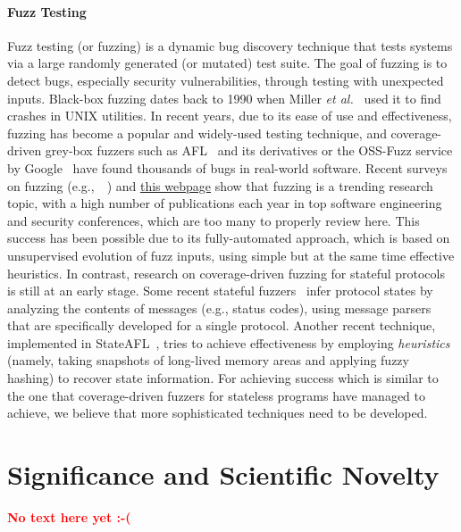 \documentclass[11pt]{article}
\newcommand{\FIX}[1]{\textcolor{red}{\textbf{#1}}}
\newcommand{\system}[1]{\mbox{\textsf{#1}}}
\newcommand{\myparagraph}{}
\let\myparagraph=\paragraph
\renewcommand{\paragraph}{\vspace{-3mm}\myparagraph}
\newcommand{\eg}{e.\/g.,\ }
\newcommand{\etal}{\textit{et al.}}
\begin{document}
\paragraph{Fuzz Testing}
Fuzz testing (or fuzzing) is a dynamic bug discovery technique that tests
systems via a large randomly generated (or mutated) test suite. The goal of
fuzzing is to detect bugs, especially security vulnerabilities, through
testing with unexpected inputs. Black-box fuzzing dates back to 1990 when
Miller \etal~\cite{Fuzz@CACM-90} used it to find crashes in UNIX utilities. In
recent years, due to its ease of use and effectiveness, fuzzing has become a
popular and widely-used testing technique, and coverage-driven grey-box
fuzzers such as \system{AFL}~\cite{AFL} and its derivatives or the OSS-Fuzz
service by Google~\cite{OSS-Fuzz@USENIX-17} have found thousands of bugs in
real-world software. Recent surveys on fuzzing
(\eg~\cite{FuzzingSurvey@TSE-21,FuzzingRoadmap@CompSurveys-22}) and
\href{https://wcventure.github.io/FuzzingPaper/}{this webpage} show that
fuzzing is a trending research topic, with a high number of publications each
year in top software engineering and security conferences, which are too many
to properly review here.
%
This success has been possible due to its fully-automated approach, which is
based on unsupervised evolution of fuzz inputs, using simple but at the same
time effective heuristics. In contrast, research on coverage-driven fuzzing
for stateful protocols is still at an early stage.
%
Some recent stateful fuzzers~\cite{AFLNET@ICST-20,Snipuzz@CCS-21} infer
protocol states by analyzing the contents of messages (e.g., status codes),
using message parsers that are specifically developed for a single protocol.
Another recent technique, implemented in
\system{StateAFL}~\cite{StateAFL@ESE-22}, tries to achieve effectiveness by
employing \emph{heuristics} (namely, taking snapshots of long-lived memory
areas and applying fuzzy hashing) to recover state information.
%
For achieving success which is similar to the one that coverage-driven fuzzers
for stateless programs have managed to achieve, we believe that more
sophisticated techniques need to be developed.


\section{Significance and Scientific Novelty} \label{sec:significance}
\FIX{No text here yet :-(}
\end{document}
